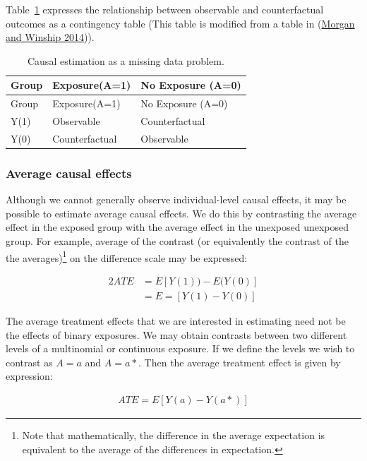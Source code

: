 \documentclass[
  singlecolumn]{report}
\begin{document}
Table~\ref{tbl-consistency} expresses the relationship between
observable and counterfactual outcomes as a contingency table (This
table is modified from a table in
(\protect\hyperlink{ref-morgan2014}{Morgan and Winship 2014})).

\hypertarget{tbl-consistency}{}
\begin{longtable}[]{@{}lll@{}}
\caption{\label{tbl-consistency}Causal estimation as a missing data
problem.}\tabularnewline
\toprule\noalign{}
Group & Exposure(A=1) & No Exposure (A=0) \\
\midrule\noalign{}
\endfirsthead
\toprule\noalign{}
Group & Exposure(A=1) & No Exposure (A=0) \\
\midrule\noalign{}
\endhead
\bottomrule\noalign{}
\endlastfoot
Y(1) & Observable & Counterfactual \\
Y(0) & Counterfactual & Observable \\
\end{longtable}

\hypertarget{average-causal-effects}{%
\subsubsection{Average causal effects}\label{average-causal-effects}}

Although we cannot generally observe individual-level causal effects, it
may be possible to estimate average causal effects. We do this by
contrasting the average effect in the exposed group with the average
effect in the unexposed unexposed group. For example, average of the
contrast (or equivalently the contrast of the the averages)\footnote{Note
  that mathematically, the difference in the average expectation is
  equivalent to the average of the differences in expectation.} on the
difference scale may be expressed:

\begin{alignat*}{2}
ATE & = E[Y(1)) - E(Y(0)]\\
& = E=[Y(1) - Y(0)]
\end{alignat*}

The average treatment effects that we are interested in estimating need
not be the effects of binary exposures. We may obtain contrasts between
two different levels of a multinomial or continuous exposure. If we
define the levels we wish to contrast as \(A = a\) and \(A = a*\). Then
the average treatment effect is given by expression:

   \begin{align*}
    ATE = E[Y(a) - Y(a*)]
    \end{align*}
\end{document}
